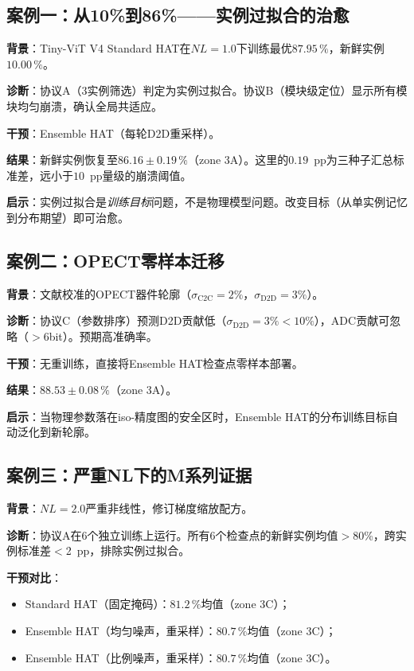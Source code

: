 \subsection{案例一：从10\%到86\%——实例过拟合的治愈}
\label{subsec:case_instance_overfitting}

\textbf{背景}：Tiny-ViT V4 Standard HAT在$NL=1.0$下训练最优$87.95\,\%$，新鲜实例$10.00\,\%$。

\textbf{诊断}：协议A（3实例筛选）判定为实例过拟合。协议B（模块级定位）显示所有模块均匀崩溃，确认全局共适应。

\textbf{干预}：Ensemble HAT（每轮D2D重采样）。

\textbf{结果}：新鲜实例恢复至$86.16\pm0.19\,\%$（zone 3A）。这里的$0.19$~pp为三种子汇总标准差，远小于$10$~pp量级的崩溃阈值。

\textbf{启示}：实例过拟合是\emph{训练目标}问题，不是物理模型问题。改变目标（从单实例记忆到分布期望）即可治愈。

\subsection{案例二：OPECT零样本迁移}
\label{subsec:case_opect}

\textbf{背景}：文献校准的OPECT器件轮廓（$\sigma_{\mathrm{C2C}}=2\%$，$\sigma_{\mathrm{D2D}}=3\%$）。

\textbf{诊断}：协议C（参数排序）预测D2D贡献低（$\sigma_{\mathrm{D2D}}=3\%<10\%$），ADC贡献可忽略（$>$6bit）。预期高准确率。

\textbf{干预}：无重训练，直接将Ensemble HAT检查点零样本部署。

\textbf{结果}：$88.53\pm0.08\,\%$（zone 3A）。

\textbf{启示}：当物理参数落在iso-精度图的安全区时，Ensemble HAT的分布训练目标自动泛化到新轮廓。

\subsection{案例三：严重NL下的M系列证据}
\label{subsec:case_m_series}

\textbf{背景}：$NL=2.0$严重非线性，修订梯度缩放配方。

\textbf{诊断}：协议A在6个独立训练上运行。所有6个检查点的新鲜实例均值$>$80\%，跨实例标准差$<$2~pp，排除实例过拟合。

\textbf{干预对比}：
\begin{itemize}
    \item Standard HAT（固定掩码）：$81.2\,\%$均值（zone 3C）；
    \item Ensemble HAT（均匀噪声，重采样）：$80.7\,\%$均值（zone 3C）；
    \item Ensemble HAT（比例噪声，重采样）：$80.7\,\%$均值（zone 3C）。
\end{itemize}


